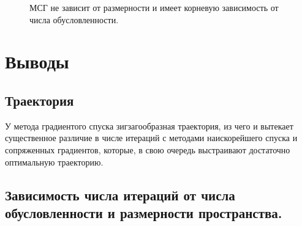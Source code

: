 \documentclass[a4paper,12pt]{article}
\begin{document}
\begin{figure}[h]
\caption{МСГ не зависит от размерности и имеет корневую зависимость от числа обусловленности.}
\end{figure}

\clearpage

\section{Выводы}

\subsection{Траектория}

У метода градиентого спуска зигзагообразная траектория, из чего и вытекает существенное различие в числе итераций с методами наискорейшего спуска и сопряженных градиентов, которые, в свою очередь выстраивают достаточно оптимальную траекторию.

\subsection{Зависимость числа итераций от числа обусловленности и размерности пространства.}
\end{document}
